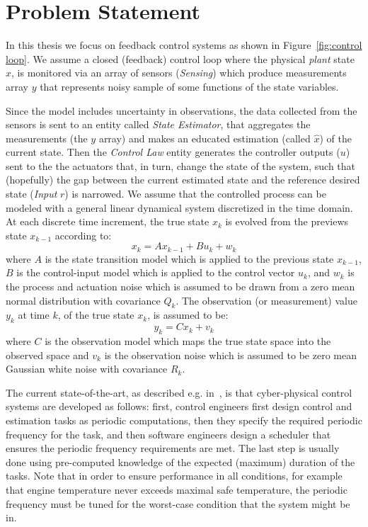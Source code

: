 \documentclass[ twoside, 12pt ]{article}
\begin{document}
\section{Problem Statement}
\label{sec:Problem}
In this thesis we focus on feedback control systems as shown in Figure~\ref{fig:control loop}. We assume a closed (feedback) control loop where the physical \textit{plant} state $x$, is monitored via an array of sensors (\textit{Sensing}) which produce measurements array $y$ that represents noisy sample of some functions of the state variables.

Since the model includes uncertainty in observations, the data collected from the sensors is sent to an entity called \textit{State Estimator}, that aggregates the measurements (the $y$ array) and makes an educated estimation (called $\hat{x}$) of the current state. Then the \textit{Control Law} entity generates the controller outputs ($u$) sent to the the actuators that, in turn, change the state of the system, such that (hopefully) the gap between the current estimated state and the reference desired state (\textit{Input} $r$) is narrowed.
We assume that the controlled process can be modeled with a general linear dynamical system discretized in the time domain. At each discrete time increment, the true state $x_k$ is evolved from the previews state $x_{k-1}$ according to: 
$$ x_{k}=Ax_{k-1} + Bu_{k} + w_{k} $$
where $A$ is the state transition model which is applied to the previous state $x_{k-1}$, $B$ is the control-input model which is applied to the control vector $u_k$, and $w_k$ is the process and actuation noise which is assumed to be drawn from a zero mean normal distribution with covariance $Q_k$. The observation (or measurement) value $y_k$ at time $k$, of the true state $x_k$, is assumed to be: 
$$y_k=Cx_k+v_k$$
where $C$ is the observation model which maps the true state space into the observed space and $v_k$ is the observation noise which is assumed to be zero mean Gaussian white noise with covariance $R_k$.

The current state-of-the-art, as described e.g. in~\cite{Cervin}, is that cyber-physical control systems are developed as follows: first, control engineers first design control and estimation tasks as periodic computations, then they specify the required periodic frequency for the task, and then software engineers design a scheduler that ensures the periodic frequency requirements are met. The last step is usually done using pre-computed knowledge of the expected (maximum) duration of the tasks. Note that in order to ensure performance in all conditions, for example that engine temperature never exceeds maximal safe temperature, the periodic frequency must be tuned for the worst-case condition that the system might be in.
\end{document}
